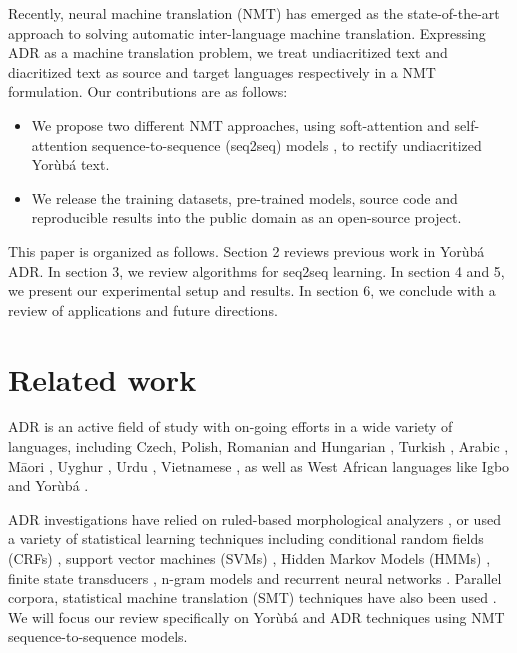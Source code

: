 \documentclass[a4paper]{article}
\begin{document}
Recently, neural machine translation (NMT) has emerged as the state-of-the-art approach to solving automatic inter-language machine translation. Expressing ADR as a machine translation problem, we treat undiacritized text and diacritized text as source and target languages respectively in a NMT formulation. Our contributions are as follows:
\begin{itemize}
\item We propose two different NMT approaches, using soft-attention and self-attention sequence-to-sequence (seq2seq) models \cite{bahdanau2014neural, vaswani2017attention}, to rectify undiacritized Yor{\`u}b{\'a} text.
\item We release the training datasets, pre-trained models, source code and reproducible results into the public domain as an open-source project.
\end{itemize}
This paper is organized as follows. Section 2 reviews previous work in Yor{\`u}b{\'a} ADR. In section 3, we review algorithms for seq2seq learning. In section 4 and 5, we present our experimental setup and results. In section 6, we conclude with a review of applications and future directions.

\section{Related work}

ADR is an active field of study with on-going efforts in a wide variety of languages, including Czech, Polish, Romanian and Hungarian \cite{novak2015automatic, tufics2008diac+, mihalcea2002letter}, Turkish \cite{arslan2016deasciification}, Arabic \cite{khorsheed2012hmm, belinkov2015arabic, nelken2005arabic, schlippe2008diacritization}, M{\=a}ori \cite{cocks2011word}, Uyghur \cite{tursun2017noisy}, Urdu \cite{raza2010automatic}, Vietnamese \cite{pham2017use, luu2012pointwise, do2013machine}, as well as West African languages like Igbo \cite{ezeani2016automatic} and Yor{\`u}b{\'a} \cite{adegbola2012quantifying, scannell2011statistical, asahiah2017restoring, de2007automatic}. 

ADR investigations have relied on ruled-based morphological analyzers \cite{novak2015automatic, raza2010automatic}, or used a variety of statistical learning techniques including conditional random fields (CRFs) \cite{schlippe2008diacritization}, support vector machines (SVMs) \cite{luu2012pointwise}, Hidden Markov Models (HMMs) \cite{khorsheed2012hmm}, finite state transducers \cite{nelken2005arabic}, n-gram models \cite{raza2010automatic} and recurrent neural networks \cite{belinkov2015arabic}. Parallel corpora, statistical machine translation (SMT) techniques have also been used \cite{novak2015automatic, schlippe2008diacritization}. We will focus our review specifically on Yor{\`u}b{\'a} and ADR techniques using NMT sequence-to-sequence models.
\end{document}
